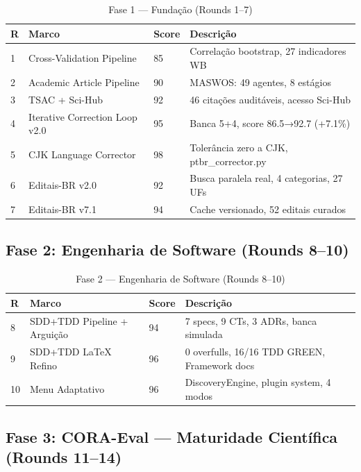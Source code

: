 \documentclass[12pt,a4paper,oneside]{article}
\begin{document}
\begin{table}[H]
\centering
\caption{Fase 1 — Fundação (Rounds 1--7)}
\label{tab:fase1}
\begin{tabular}{p{}p{}p{}p{}}
\toprule
\textbf{R} & \textbf{Marco} & \textbf{Score} & \textbf{Descrição} \\
\midrule
1 & Cross-Validation Pipeline & 85 & Correlação bootstrap, 27 indicadores WB \\
2 & Academic Article Pipeline & 90 & MASWOS: 49 agentes, 8 estágios \\
3 & TSAC + Sci-Hub & 92 & 46 citações auditáveis, acesso Sci-Hub \\
4 & Iterative Correction Loop v2.0 & 95 & Banca 5+4, score 86.5→92.7 (+7.1\%) \\
5 & CJK Language Corrector & 98 & Tolerância zero a CJK, ptbr\_corrector.py \\
6 & Editais-BR v2.0 & 92 & Busca paralela real, 4 categorias, 27 UFs \\
7 & Editais-BR v7.1 & 94 & Cache versionado, 52 editais curados \\
\bottomrule
\end{tabular}
\end{table}

\subsection{Fase 2: Engenharia de Software (Rounds 8--10)}

\begin{table}[H]
\centering
\caption{Fase 2 — Engenharia de Software (Rounds 8--10)}
\label{tab:fase2}
\begin{tabular}{p{}p{}p{}p{}}
\toprule
\textbf{R} & \textbf{Marco} & \textbf{Score} & \textbf{Descrição} \\
\midrule
8 & SDD+TDD Pipeline + Arguição & 94 & 7 specs, 9 CTs, 3 ADRs, banca simulada \\
9 & SDD+TDD LaTeX Refino & 96 & 0 overfulls, 16/16 TDD GREEN, Framework docs \\
10 & Menu Adaptativo & 96 & DiscoveryEngine, plugin system, 4 modos \\
\bottomrule
\end{tabular}
\end{table}

\subsection{Fase 3: CORA-Eval — Maturidade Científica (Rounds 11--14)}
\end{document}
